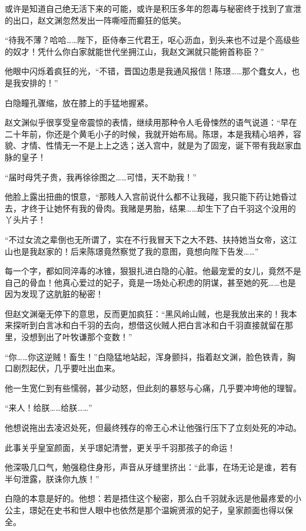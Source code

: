 或许是知道自己绝无活下来的可能，或许是积压多年的怨毒与秘密终于找到了宣泄的出口，赵文渊忽然发出一阵嘶哑而癫狂的低笑。

“待我不薄？哈哈……陛下，臣侍奉三代君王，呕心沥血，到头来也不过是个高级些的奴才！凭什么你白家就能世代坐拥江山，我赵文渊就只能俯首称臣？”

他眼中闪烁着疯狂的光，“不错，晋国边患是我通风报信！陈璟……那个蠢女人，也是我安排的！”

白隐瞳孔骤缩，放在膝上的手猛地握紧。

赵文渊似乎很享受皇帝震惊的表情，继续用那种令人毛骨悚然的语气说道：“早在二十年前，你还是个黄毛小子的时候，我就开始布局。陈璟，本是我精心培养，容貌、才情、性情无一不是上上之选；送入宫中，就是为了固宠，诞下带有我赵家血脉的皇子！

“届时母凭子贵，我再徐徐图之……可惜，天不助我！”

他脸上露出扭曲的恨意，“那贱人入宫前说什么都不让我碰，我只能下药让她昏过去，才终于让她怀有我的骨肉。我赌是男胎，结果……却生下了白千羽这个没用的丫头片子！

“不过女流之辈倒也无所谓了，实在不行我冒天下之大不韪、扶持她当女帝，这江山也是我赵家的！后来陈璟竟然察觉了我的意图，竟想向陛下告发……”

每一个字，都如同淬毒的冰锥，狠狠扎进白隐的心脏。他最宠爱的女儿，竟然不是自己的骨血！他真心爱过的妃子，竟是一场处心积虑的阴谋，甚至她的死……也是因为发现了这肮脏的秘密！

但赵文渊毫无停下的意思，反而更加疯狂：“黑风岭山贼，也是我放出来的！我本来探听到白言冰和白千羽的去向，想借这伙贼人把白言冰和白千羽直接就留在那里，没想到出了叶牧谦那个变数！”

“你……你这逆贼！畜生！”白隐猛地站起，浑身颤抖，指着赵文渊，脸色铁青，胸口剧烈起伏，几乎要吐出血来。

他一生宽仁到有些懦弱，甚少动怒，但此刻的暴怒与心痛，几乎要冲垮他的理智。

“来人！给朕……给朕……”

他想说拖出去凌迟处死，但最终残存的帝王心术让他强行压下了立刻处死的冲动。

此事关乎皇室颜面，关乎璟妃清誉，更关乎千羽那孩子的命运！

他深吸几口气，勉强稳住身形，声音从牙缝里挤出：“此事，在场无论是谁，若有半句泄露，朕诛你九族！”

\vspace{2em}

白隐的本意是好的。他想：若是捂住这个秘密，那么白千羽就永远是他最疼爱的小公主，璟妃在史书和世人眼中也依然是那个温婉贤淑的妃子，皇家颜面也得以保全。

